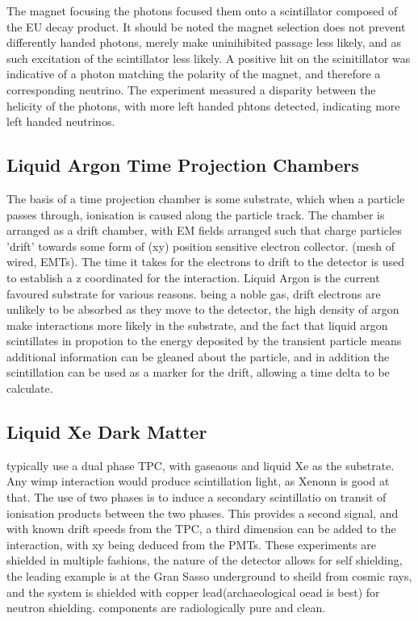 \documentclass[]{article}
\begin{document}
	The magnet focusing the photons focused them onto a scintillator composed of the EU decay product. It should be noted the magnet selection does not prevent differently handed photons, merely make uninihibited passage less likely, and as such excitation of the scintillator less likely. A positive hit on the scinitillator was indicative of a photon matching the polarity of the magnet, and therefore a corresponding  neutrino. The experiment measured a disparity between the helicity of the photons, with more left handed phtons detected, indicating more left handed neutrinos.
	
	\subsection{Liquid Argon Time Projection Chambers} 
	The basis of a time projection chamber is some substrate, which when a particle passes through, ionisation is caused along the particle track. The chamber is arranged as a drift chamber, with EM fields arranged such that charge particles 'drift' towards some form of (xy) position sensitive electron collector. (mesh of wired, EMTs). The time it takes for the electrons to drift to the detector is used to establish a z coordinated for the interaction.	
	Liquid Argon is the current favoured substrate for various reasons. being a noble gas, drift electrons are unlikely to be absorbed as they move to the detector, the high density of argon make interactions more likely in the substrate, and the fact that liquid argon scintillates in propotion to the energy deposited by the transient particle means additional information can be gleaned about the particle, and in addition the scintillation can be used as a marker for the drift, allowing a time delta to be calculate.
	
	\subsection{Liquid Xe Dark Matter}
	
	typically use a dual phase TPC, with gaseaous and liquid Xe as the substrate. Any wimp interaction would produce scintillation light, as Xenonn is good at that. The use of two phases is to induce a secondary scintillatio on transit of ionisation products between the two phases. This provides a second signal, and with known drift speeds from the TPC, a third dimension can be added to the interaction, with xy being deduced from the PMTs. These experiments are shielded in multiple fashions, the nature of the detector allows for self shielding, the leading example is at the Gran Sasso underground to sheild from cosmic rays, and the system is shielded with copper lead(archaeological oead is best) for neutron shielding. components are radiologically pure and clean.
	
\end{document}
